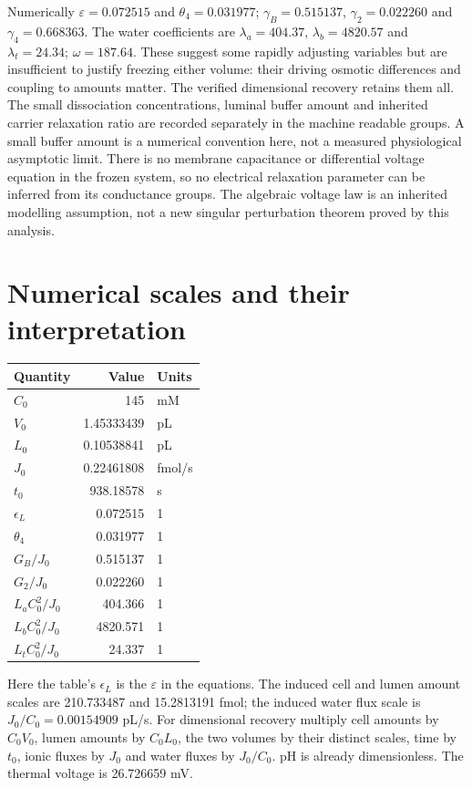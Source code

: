 Numerically $\varepsilon=0.072515$ and $\theta_4=0.031977$;
$\gamma_B=0.515137$, $\gamma_2=0.022260$ and
$\gamma_4=0.668363$.  The water coefficients are
$\lambda_a=404.37$, $\lambda_b=4820.57$ and $\lambda_t=24.34$;
$\omega=187.64$.  These suggest some rapidly adjusting variables but
are insufficient to justify freezing either volume: their driving
osmotic differences and coupling to amounts matter.  The verified
dimensional recovery retains them all.
The small dissociation concentrations, luminal buffer amount and inherited
carrier relaxation ratio are recorded separately in the machine readable
groups.  A small buffer amount is a numerical convention here, not a
measured physiological asymptotic limit.  There is no membrane capacitance
or differential voltage equation in the frozen system, so no electrical
relaxation parameter can be inferred from its conductance groups.  The
algebraic voltage law is an inherited modelling assumption, not a new
singular perturbation theorem proved by this analysis.



\section{Numerical scales and their interpretation}
\begin{center}

\begin{tabular}{lrl}
\toprule
Quantity & Value & Units \\
\midrule
$C_0$ & 145 & mM \\
$V_0$ & 1.45333439 & pL \\
$L_0$ & 0.10538841 & pL \\
$J_0$ & 0.22461808 & fmol/s \\
$t_0$ & 938.18578 & s \\
$\epsilon_L$ & 0.072515 & 1 \\
$\theta_4$ & 0.031977 & 1 \\
$G_B/J_0$ & 0.515137 & 1 \\
$G_2/J_0$ & 0.022260 & 1 \\
$L_aC_0^2/J_0$ & 404.366 & 1 \\
$L_bC_0^2/J_0$ & 4820.571 & 1 \\
$L_tC_0^2/J_0$ & 24.337 & 1 \\
\bottomrule
\end{tabular}


\end{center}
Here the table's $\epsilon_L$ is the $\varepsilon$ in the equations.
The induced cell and lumen amount scales are 210.733487 and
15.2813191 fmol; the induced water flux scale is
$J_0/C_0=0.00154909$ pL/s. For dimensional recovery multiply cell amounts
by $C_0V_0$, lumen amounts by $C_0L_0$, the two volumes by their distinct
scales, time by $t_0$, ionic fluxes by $J_0$ and water fluxes by $J_0/C_0$.
pH is already dimensionless. The thermal voltage is 26.726659 mV.

